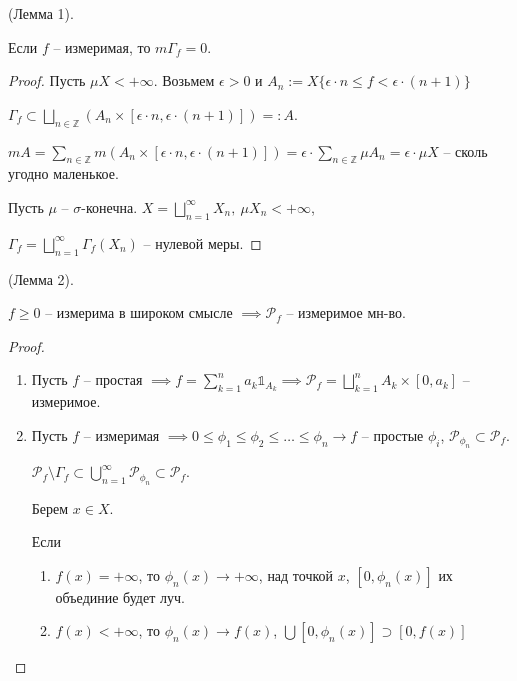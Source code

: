 \begin{lemma}
    (Лемма 1).
    
    Если $f$ -- измеримая, то $m \Gamma_f = 0$.
\end{lemma}
\begin{proof}
    Пусть $\mu X < +\infty$. Возьмем $\epsilon > 0$ и $A_n := X \{ \epsilon \cdot n \leq f < \epsilon \cdot (n + 1) \}$

    $\Gamma_f \subset \bigsqcup_{n \in \mathbb{Z}} \left(A_n \times [\epsilon \cdot n, \epsilon \cdot (n + 1)]\right) =: A$.


    $m A = \sum_{n \in \mathbb{Z}} m \left( A_n \times [\epsilon \cdot n, \epsilon \cdot (n + 1)] \right) = \epsilon \cdot \sum_{n \in \mathbb{Z}} \mu A_n = \epsilon \cdot \mu X$ -- сколь угодно маленькое.

    Пусть $\mu$ -- $\sigma$-конечна. $X = \bigsqcup_{n=1}^{\infty} X_n, \ \mu X_n < +\infty$,
    
    $\Gamma_f = \bigsqcup_{n=1}^{\infty} \Gamma_f (X_n)$ -- нулевой меры.
\end{proof}

\begin{lemma}
    (Лемма 2).

    $f \geq 0$ -- измерима в широком смысле $\implies \mathcal{P}_f$ -- измеримое мн-во.
\end{lemma}
\begin{proof}
    \begin{enumerate}
        \item {
            Пусть $f$ -- простая $\implies f = \sum_{k = 1}^{n} a_k \mathds{1}_{A_k} \implies \mathcal{P}_f = \bigsqcup_{k=1}^{n} A_k \times [0, a_k]$ -- измеримое.
        }

        \item {
            Пусть $f$ -- измеримая $\implies 0 \leq \phi_1 \leq \phi_2 \leq \dots \leq \phi_n \rightarrow f$ -- простые $\phi_i$, $\mathcal{P}_{\phi_n} \subset \mathcal{P}_f$.

            $\mathcal{P}_f \setminus \Gamma_f \subset \bigcup_{n=1}^{\infty} \mathcal{P}_{\phi_n} \subset \mathcal{P}_f$.

            Берем $x \in X$.
            
            Если
            \begin{enumerate}
                \item {
                    $f(x) = +\infty$, то $\phi_n(x) \rightarrow +\infty$, над точкой $x$, $[0, \phi_n(x)]$ их объединие будет луч.
                }
                \item {
                    $f(x) < +\infty$, то $\phi_n(x) \rightarrow f(x)$, $\bigcup [0, \phi_n(x)] \supset [0, f(x)]$
                }
            \end{enumerate}
        }
    \end{enumerate}
\end{proof}

